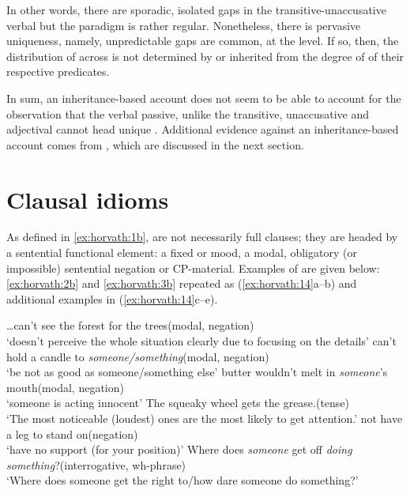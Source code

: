 \documentclass[output=paper,
modfonts
]{LSP/langsci}
\begin{document}
In other words, there are sporadic, isolated gaps in the
transitive-unaccusative verbal  but the paradigm is rather
regular. Nonetheless, there is pervasive uniqueness, namely,
unpredictable gaps are common, at the  level. If so, then, the
distribution of  across  is not determined by or
inherited from the degree of  of their respective
predicates.

In sum, an inheritance-based account does not seem to be able to account
for the observation that the verbal passive, unlike the transitive,
unaccusative and adjectival  cannot head unique .
Additional evidence against an inheritance-based account comes from
, which are discussed in the next section.

\section{Clausal idioms}\label{sec:horvath:3}

As defined in \ref{ex:horvath:1b},  are not necessarily full clauses;
they are headed by a sentential functional element: a fixed  or
mood, a modal, obligatory (or impossible) sentential negation or
CP-material. Examples of  are given below: \ref{ex:horvath:2b} and \ref{ex:horvath:3b}
repeated as (\ref{ex:horvath:14}a--b) and additional examples in (\ref{ex:horvath:14}c--e).

\ea \label{ex:horvath:14}
	\ea \label{ex:horvath:14a} \ldots{}can't see the forest for the trees\hfill (modal, negation)\\
	`doesn't perceive the whole situation clearly due to focusing on the
	details'
	\ex \label{ex:horvath:14b} can't hold a candle to \emph{someone/something}\hfill(modal, negation)\\
	`be not as good as someone/something else'
		\ex \label{ex:horvath:14c} butter wouldn't melt in \emph{someone}'s mouth\hfill (modal, negation)\\
	`someone is acting innocent'
		\ex \label{ex:horvath:14d} The squeaky wheel gets the grease.\hfill (tense)\\
	 `The most noticeable (loudest) ones are the most likely to get attention.'
	\ex \label{ex:horvath:14e} not have a leg to stand on\hfill (negation)\\
	`have no support (for your position)'
	\ex \label{ex:horvath:14f} Where does \emph{someone} get off \emph{doing something}?\hfill(interrogative, wh-phrase)\\
	`Where does someone get the right to/how dare someone do something?'
	\z
\z
\end{document}
